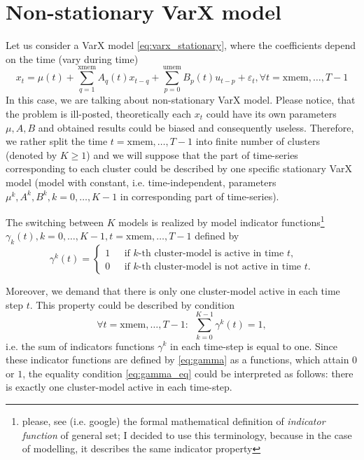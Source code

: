 \documentclass{article}
\begin{document}
 \section {Non-stationary VarX model}

 Let us consider a VarX model \eqref{eq:varx_stationary}, where the coefficients depend on the time (vary during time)
 \begin{equation}
  \label{eq:varx_nonstationary}
	x_t = \mu(t) + \sum\limits_{q=1}^{\mathrm{xmem}} A_q(t) x_{t-q} + \sum\limits_{p=0}^{\mathrm{umem}} B_p(t) u_{t-p} + \varepsilon_t, \forall t = \mathrm{xmem}, \dots, T-1
 \end{equation}
 In this case, we are talking about non-stationary VarX model. Please notice, that the problem is ill-posted, theoretically each $x_t$ could have its own parameters $\mu,A,B$ and
 obtained results could be biased and consequently useless. Therefore, we rather split the time $t=\mathrm{xmem},\dots,T-1$ into finite number of clusters (denoted by $K \geq 1$)
 and we will suppose that the part of time-series corresponding to each cluster could be described by one specific stationary VarX model (model with constant, i.e. time-independent, parameters $\mu^k,A^k,B^k, k = 0,\dots,K-1$ in corresponding part of time-series). \newline
 
 The switching between $K$ models is realized by model indicator functions\footnote{please, see (i.e. google) the formal mathematical definition of \emph{indicator function} of general set; I decided to use this terminology, because in the case of modelling, it describes the same indicator property}
 $\gamma_k(t), k=0,\dots,K-1, t = \mathrm{xmem},\dots,T-1$ defined by
 \begin{equation}
  \label{eq:gamma}
  \gamma^k(t) =
  \left\lbrace
   \begin{array}{ll}
    1 ~~~ & \textrm{if $k$-th cluster-model is active in time $t$,} \\
    0 ~~~ & \textrm{if $k$-th cluster-model is not active in time $t$.}
   \end{array}
  \right.
 \end{equation} 

 Moreover, we demand that there is only one cluster-model active in each time step $t$. This property could be described by condition
 \begin{equation}
  \label{eq:gamma_eq}
  \forall t = \mathrm{xmem}, \dots, T-1: ~~ \sum\limits_{k=0}^{K-1} \gamma^k (t) = 1,
 \end{equation}
 i.e. the sum of indicators functions $\gamma^k$ in each time-step is equal to one. Since these indicator functions are defined by \eqref{eq:gamma}
 as a functions, which attain $0$ or $1$, the equality condition \eqref{eq:gamma_eq} could be interpreted as follows: there is exactly one cluster-model
 active in each time-step.
 
\end{document}

